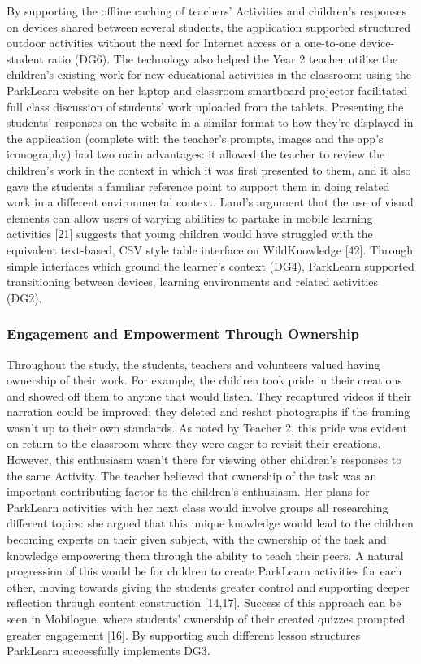 By supporting the offline caching of teachers’ Activities and children’s responses on devices shared between several students, the application supported structured outdoor activities without the need for Internet access or a one-to-one device-student ratio (DG6). The technology also helped the Year 2 teacher utilise the children’s existing work for new educational activities in the classroom: using the ParkLearn website on her laptop and classroom smartboard projector facilitated full class discussion of students’ work uploaded from the tablets. Presenting the students’ responses on the website in a similar format to how they’re displayed in the application (complete with the teacher’s prompts, images and the app’s iconography) had two main advantages: it allowed the teacher to review the children’s work in the context in which it was first presented to them, and it also gave the students a familiar reference point to support them in doing related work in a different environmental context. Land’s argument that the use of visual elements can allow users of varying abilities to partake in mobile learning activities [21] suggests that young children would have struggled with the equivalent text-based, CSV style table interface on WildKnowledge [42]. Through simple interfaces which ground the learner’s context (DG4), ParkLearn supported transitioning between devices, learning environments and related activities (DG2). \subsubsection{Engagement and Empowerment Through Ownership} Throughout the study, the students, teachers and volunteers valued having ownership of their work. For example, the children took pride in their creations and showed off them to anyone that would listen. They recaptured videos if their narration could be improved; they deleted and reshot photographs if the framing wasn’t up to their own standards. As noted by Teacher 2, this pride was evident on return to the classroom where they were eager to revisit their creations. However, this enthusiasm wasn’t there for viewing other children’s responses to the same Activity. The teacher believed that ownership of the task was an important contributing factor to the children’s enthusiasm. Her plans for ParkLearn activities with her next class would involve groups all researching different topics: she argued that this unique knowledge would lead to the children becoming experts on their given subject, with the ownership of the task and knowledge empowering them through the ability to teach their peers. A natural progression of this would be for children to create ParkLearn activities for each other, moving towards giving the students greater control and supporting deeper reflection through content construction [14,17]. Success of this approach can be seen in Mobilogue, where students’ ownership of their created quizzes prompted greater engagement [16]. By supporting such different lesson structures ParkLearn successfully implements DG3.

